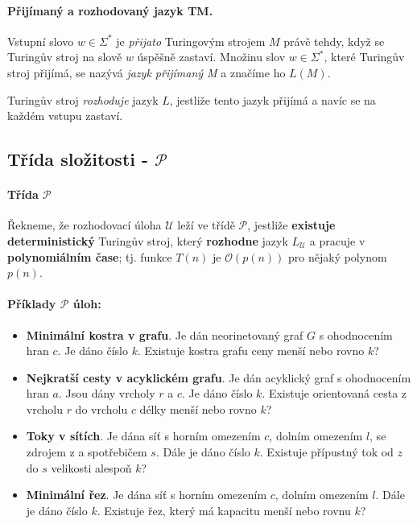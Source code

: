 \paragraph{Přijímaný a rozhodovaný jazyk TM.} Vstupní slovo $w \in \Sigma^*$ je \textit{přijato} Turingovým strojem $M$ právě tehdy, když se Turingův stroj na slově $w$ úspěšně zastaví. Množinu slov $w \in \Sigma^*$, které Turingův stroj přijímá, se nazývá \textit{jazyk přijímaný M} a značíme ho $L(M)$.

Turingův stroj \textit{rozhoduje} jazyk $L$, jestliže tento jazyk přijímá a navíc se na každém vstupu zastaví.

\subsection{Třída složitosti -  $\mathcal{P}$}
\label{heading:p}

\paragraph{Třída $\mathcal{P}$} Řekneme, že rozhodovací úloha $\mathcal{U}$ leží ve třídě $\mathcal{P}$, jestliže \textbf{existuje deterministický} Turingův stroj, který \textbf{rozhodne} jazyk $L_\mathcal{U}$ a pracuje v \textbf{polynomiálním čase}; tj. funkce $T(n)$ je $\mathcal{O}(p(n))$ pro nějaký polynom $p(n)$.

\paragraph{Příklady $\mathcal{P}$ úloh:}
\begin{itemize}[itemsep=0pt]
    \item \textbf{\color{darkBrown}Minimální kostra v grafu}. Je dán neorinetovaný graf $G$ s ohodnocením hran $c$. Je dáno číslo $k$. Existuje kostra grafu ceny menší nebo rovno $k$?
    
    \item \textbf{\color{darkBrown}Nejkratší cesty v acyklickém grafu}. Je dán acyklický graf s ohodnocením hran $a$. Jsou dány vrcholy $r$ a $c$. Je dáno číslo $k$. Existuje orientovaná cesta z vrcholu $r$ do vrcholu $c$ délky menší nebo rovno $k$?
    
    \item \textbf{\color{darkBrown}Toky v sítích}. Je dána síť s horním omezením $c$, dolním omezením $l$, se zdrojem z a spotřebičem $s$. Dále je dáno číslo $k$. Existuje přípustný tok od $z$ do $s$ velikosti alespoň $k$?
    
    \item \textbf{\color{darkBrown}Minimální řez}. Je dána síť s horním omezením $c$, dolním omezením $l$. Dále je dáno číslo $k$. Existuje řez, který má kapacitu menší nebo rovnu $k$?
\end{itemize}

